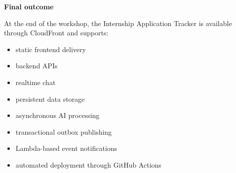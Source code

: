 \vspace{0.5em}\noindent\textbf{Final outcome}\par

At the end of the workshop, the Internship Application Tracker is
available through CloudFront and supports:

\begin{itemize}
\tightlist
\item
  static frontend delivery
\item
  backend APIs
\item
  realtime chat
\item
  persistent data storage
\item
  asynchronous AI processing
\item
  transactional outbox publishing
\item
  Lambda-based event notifications
\item
  automated deployment through GitHub Actions
\end{itemize}
